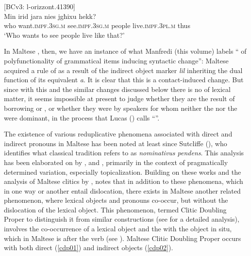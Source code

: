 \documentclass[output=paper]{langsci/langscibook}
\begin{document}
\ea\label{dom3}
{[BCv3: l-orizzont.41390]}\\
\gll Min irid jara nies jgħixu hekk?\\
	who want.\textsc{impf.3sg.m} see.\textsc{impf.3sg.m} people live.\textsc{impf.3pl.m} thus\\
	\glt `Who wants to see people live like that?'\\
\z

In Maltese , then, we have an instance of what Manfredi (this volume) labels `` of polyfunctionality of grammatical items inducing syntactic change'': Maltese acquired a rule of  as a result of the indirect object marker \textit{lil} inheriting the dual function of its  equivalent \textit{a}. It is clear that this is a contact-induced change. But since with this and the similar changes discussed below there is no  of lexical matter, it seems impossible at present to judge whether they are the result of borrowing or , or whether they were  by speakers for whom neither the  nor the  were dominant, in the process that Lucas (\citeyear{Lucas2015}) calls ``''.


The existence of various reduplicative phenomena associated with direct and indirect  pronouns in Maltese has been noted at least since Sutcliffe (\citeyear[179]{sutcliffe}), who identifies what classical tradition refers to as \textit{nominativus pendens}. This analysis has been elaborated on by \cite{fabri1993}, \cite{BorgAzzopardi-Alexander1997} and \cite{fabriborgtopicfocus}, primarily in the context of pragmatically determined  variation, especially topicalization. Building on these works and the analysis of Maltese clitics by \cite{camilleri2011}, \cite{bulbul2014} notes that in addition to these phenomena, which in one way or another entail dislocation, there exists in Maltese another related phenomenon, where lexical objects and  pronouns co-occur, but without the dislocation of the lexical object. This phenomenon, termed Clitic Doubling Proper to distinguish it from similar constructions (see \citealt{krapovacinque2008} for a detailed analysis), involves the co-occurrence of a lexical object and the  with the object in situ, which in Maltese is after the verb (see \citealt{bulbul2018}). Maltese Clitic Doubling Proper occurs with both direct (\ref{cdp01}) and indirect objects (\ref{cdp02}).
\end{document}
